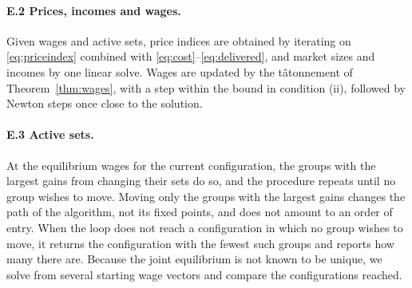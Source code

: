 \documentclass[11pt]{article}
\theoremstyle{definition}
\theoremstyle{remark}
\begin{document}
\paragraph{E.2 Prices, incomes and wages.} Given wages and active sets, price indices
are obtained by iterating on \eqref{eq:priceindex} combined with \eqref{eq:cost}--\eqref{eq:delivered}, and market sizes
and incomes by one linear solve. Wages are updated by the tâtonnement of
Theorem~\ref{thm:wages}, with a step within the bound in condition (ii), followed by
Newton steps once close to the solution.

\paragraph{E.3 Active sets.} At the equilibrium wages for the current configuration,
the groups with the largest gains from changing their sets do so, and the procedure
repeats until no group wishes to move. Moving only the groups with the largest gains
changes the path of the algorithm, not its fixed points, and does not amount to an
order of entry. When the loop does not reach a configuration in which no group wishes
to move, it returns the configuration with the fewest such groups and reports how many
there are. Because the joint equilibrium is not known to be unique, we solve from
several starting wage vectors and compare the configurations reached.
\end{document}
